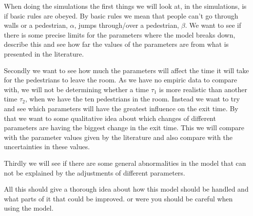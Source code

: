 When doing the simulations the first things we will look at, in the simulations, is if basic rules are obeyed. By basic rules we mean that people can't go through walls or a pedestrian, $\alpha$, jumps through/over a pedestrian, $\beta$. We want to see if there is some precise limits for the parameters where the model breaks down, describe this and see how far the values of the parameters are from what is presented in the literature.   

Secondly we want to see how much the parameters will affect the time it will take for the pedestrians to leave the room. As we have no empiric data to compare with, we will not be determining whether a time $\tau_1$ is more realistic than another time $\tau_2$, when we have the ten pedestrians in the room. Instead we want to try and see which parameters will have the greatest influence on the exit time. By that we want to some qualitative idea about which changes of different parameters are having the biggest change in the exit time. This we will compare with the parameter values given by the literature and also compare with the uncertainties in these values.

Thirdly we will see if there are some general abnormalities in the model that can not be explained by the adjustments of different parameters.

All this should give a thorough idea about how this model should be handled and what parts of it that could be improved. or were you should be careful when using the model.